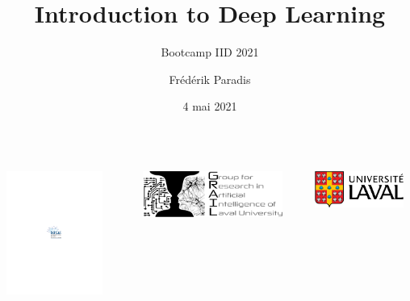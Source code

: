 \documentclass[english,usenames,dvipsnames]{beamer}
\title[]{Introduction to Deep Learning}
\subtitle{Bootcamp IID 2021}
\author[F. Paradis]{Frédérik Paradis}
\institute{\texttt{frederik.paradis.1@ulaval.ca}}
\date[]{4 mai 2021}
\begin{document}
\begin{frame}[nonum]
\titlepage
\begin{center}
	\vspace{-10mm}
	\begin{columns}
		\begin{column}{0.33\textwidth}
			\includegraphics[width=0.8\textwidth]{crdmul_en.pdf}
		\end{column}
		\begin{column}{0.33\textwidth}
			\includegraphics[width=0.9\textwidth]{grail.pdf}
		\end{column}
		\begin{column}{0.33\textwidth}
			\hspace{-5mm}
			\includegraphics[width=0.9\textwidth]{ul.pdf}
		\end{column}
	\end{columns}
\end{center}
\end{frame}
\end{document}
